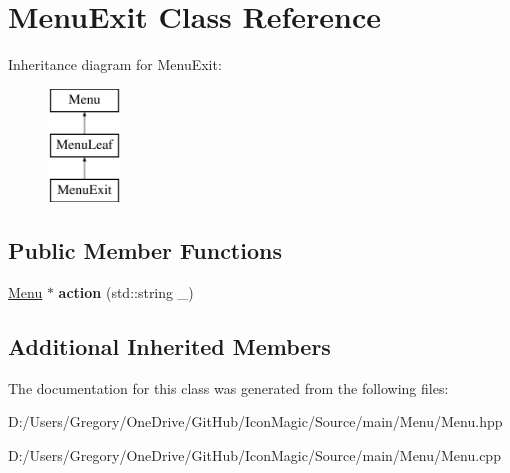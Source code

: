 \hypertarget{class_menu_exit}{}\section{Menu\+Exit Class Reference}
\label{class_menu_exit}
Inheritance diagram for Menu\+Exit\+:\begin{figure}[H]
\begin{center}
\leavevmode
\includegraphics[height=3.000000cm]{class_menu_exit}
\end{center}
\end{figure}
\subsection*{Public Member Functions}
\begin{DoxyCompactItemize}
\item 
\hypertarget{class_menu_exit_aa926e3f17919a4b35f703ad926de4e07}{}\hyperlink{class_menu}{Menu} $\ast$ {\bfseries action} (std\+::string \+\_\+)\label{class_menu_exit_aa926e3f17919a4b35f703ad926de4e07}

\end{DoxyCompactItemize}
\subsection*{Additional Inherited Members}


The documentation for this class was generated from the following files\+:\begin{DoxyCompactItemize}
\item 
D\+:/\+Users/\+Gregory/\+One\+Drive/\+Git\+Hub/\+Icon\+Magic/\+Source/main/\+Menu/Menu.\+hpp\item 
D\+:/\+Users/\+Gregory/\+One\+Drive/\+Git\+Hub/\+Icon\+Magic/\+Source/main/\+Menu/Menu.\+cpp\end{DoxyCompactItemize}
